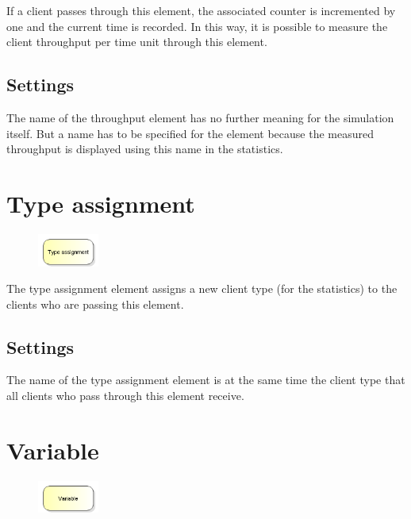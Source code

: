 If a client passes through this element, the associated counter is incremented by one
and the current time is recorded. In this way, it is possible to measure the client
throughput per time unit through this element.

\subsection*{Settings}

The name of the throughput element has no further meaning for the simulation itself.
But a name has to be specified for the element because the measured throughput is
displayed using this name in the statistics.


\section{Type assignment}
\label{ref:ModelElementAssign}

\begin{figure}
\vspace{-22pt}
\includegraphics[width=2cm]{imageModelElementAssign.png}
\vspace{-22pt}
\end{figure}

The type assignment element assigns a new client type (for the statistics) to the clients who are passing this element.

\subsection*{Settings}

The name of the type assignment element is at the same time the client type that all clients who pass through this element receive.


\section{Variable}
\label{ref:ModelElementSet}

\begin{figure}
\vspace{-22pt}
\includegraphics[width=2cm]{imageModelElementSet.png}
\vspace{-22pt}
\end{figure}


